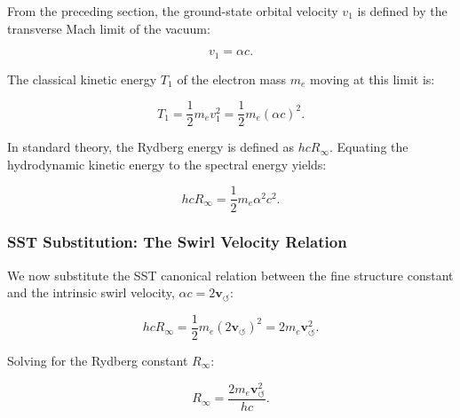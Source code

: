 \documentclass[10pt,reprint,aps,onecolumn,nofootinbib]{revtex4-2}
\begin{document}
        From the preceding section, the ground-state orbital velocity $v_1$ is
        defined by the transverse Mach limit of the vacuum:

        \begin{equation}
            v_1 = \alpha c.
            \label{eq:v1_mach}
        \end{equation}

        The classical kinetic energy $T_1$ of the electron mass $m_e$ moving
        at this limit is:

        \begin{equation}
            T_1 = \frac{1}{2} m_e v_1^2 = \frac{1}{2} m_e (\alpha c)^2.
        \end{equation}

        In standard theory, the Rydberg energy is defined as $hcR_\infty$.
        Equating the hydrodynamic kinetic energy to the spectral energy yields:

        \begin{equation}
            hcR_\infty = \frac{1}{2} m_e \alpha^2 c^2.
        \end{equation}

    \subsubsection*{SST Substitution: The Swirl Velocity Relation}

        We now substitute the SST canonical relation between the fine structure
        constant and the intrinsic swirl velocity, $\alpha c = 2 \mathbf{v}_{\!\boldsymbol{\circlearrowleft}}$:

        \begin{equation}
            hcR_\infty = \frac{1}{2} m_e (2 \mathbf{v}_{\!\boldsymbol{\circlearrowleft}})^2
            = 2 m_e \mathbf{v}_{\!\boldsymbol{\circlearrowleft}}^2.
        \end{equation}

        Solving for the Rydberg constant $R_\infty$:

        \begin{equation}
            R_\infty = \frac{2 m_e \mathbf{v}_{\!\boldsymbol{\circlearrowleft}}^2}{hc}.
            \label{eq:SST_Rydberg}
        \end{equation}

\end{document}
